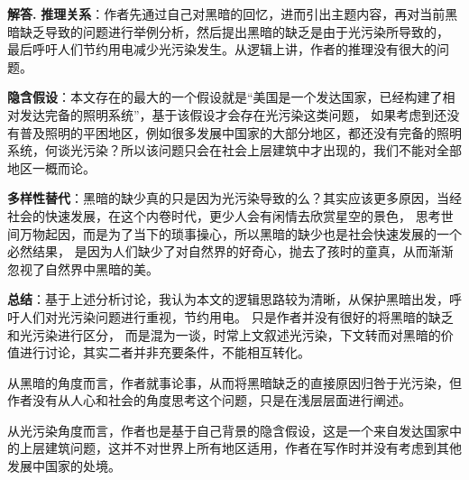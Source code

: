 \documentclass[12pt, a4paper, oneside]{ctexart}
\newenvironment{solution}[1][]{\par\noindent\textbf{#1解答. }}{\smallskip\par}  %
\begin{document}
\begin{solution}
    \textbf{推理关系}：作者先通过自己对黑暗的回忆，进而引出主题内容，再对当前黑暗缺乏导致的问题进行举例分析，然后提出黑暗的缺乏是由于光污染所导致的，
    最后呼吁人们节约用电减少光污染发生。从逻辑上讲，作者的推理没有很大的问题。

    \textbf{隐含假设}：本文存在的最大的一个假设就是“美国是一个发达国家，已经构建了相对发达完备的照明系统”，基于该假设才会存在光污染这类问题，
    如果考虑到还没有普及照明的平困地区，例如很多发展中国家的大部分地区，都还没有完备的照明系统，何谈光污染？所以该问题只会在社会上层建筑中才出现的，我们不能对全部地区一概而论。

    \textbf{多样性替代}：黑暗的缺少真的只是因为光污染导致的么？其实应该更多原因，当经社会的快速发展，在这个内卷时代，更少人会有闲情去欣赏星空的景色，
    思考世间万物起因，而是为了当下的琐事操心，所以黑暗的缺少也是社会快速发展的一个必然结果，
    是因为人们缺少了对自然界的好奇心，抛去了孩时的童真，从而渐渐忽视了自然界中黑暗的美。

    \textbf{总结}：基于上述分析讨论，我认为本文的逻辑思路较为清晰，从保护黑暗出发，呼吁人们对光污染问题进行重视，节约用电。
    只是作者并没有很好的将黑暗的缺乏和光污染进行区分，
    而是混为一谈，时常上文叙述光污染，下文转而对黑暗的价值进行讨论，其实二者并非充要条件，不能相互转化。

    从黑暗的角度而言，作者就事论事，从而将黑暗缺乏的直接原因归咎于光污染，但作者没有从人心和社会的角度思考这个问题，只是在浅层层面进行阐述。

    从光污染角度而言，作者也是基于自己背景的隐含假设，这是一个来自发达国家中的上层建筑问题，这并不对世界上所有地区适用，作者在写作时并没有考虑到其他发展中国家的处境。

\end{solution}
\end{document}
